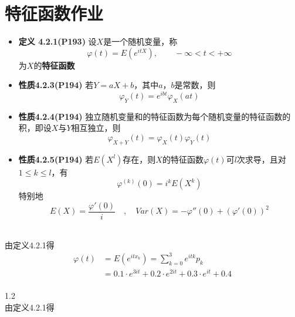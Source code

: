 \documentclass[a4paper]{ctexart}    %
\begin{document}
	\section{特征函数作业}
	\noindent
	\begin{tcolorbox}
		[colframe=blue!25,
		colback=blue!10,
		coltitle=blue!20!black,  
		fonttitle=\bfseries,
		adjusted title=Formula Or Theorem:
		]
		\begin{itemize}
			\item \textbf{定义 4.2.1(P193)} 设$ X $是一个随机变量，称
			\begin{equation*}
				\varphi(t) = E(e^{itX}), \qquad -\infty < t < +\infty
			\end{equation*}
			为$ X $的\textbf{特征函数}
			\item \textbf{性质4.2.3(P194)} 若$ Y = aX + b $，其中$ a $，$ b $是常数，则
			\begin{equation*}
				\varphi_{Y}(t) = e^{ibt}\varphi_{X} (at)
			\end{equation*}
			\item \textbf{性质4.2.4(P194)} 独立随机变量和的特征函数为每个随机变量的特征函数的积，即设$ X $与$ Y $相互独立，则
			\begin{equation*}
				\varphi_{X+Y}(t) = \varphi_{X}(t)\varphi_{Y}(t)
			\end{equation*}
			\item \textbf{性质4.2.5(P194)} 若$ E(X^{l}) $存在，则$ X $的特征函数$ \varphi(t) $可$ l $次求导，且对$ 1 \leq k \leq l $，有
			\begin{equation*}
				\varphi^{(k)}(0) = i^kE(X^k)
			\end{equation*}
			特别地
			\begin{equation*}
				E(X) = \frac{\varphi'(0)}{i} \quad , \quad Var(X) = -\varphi''(0) + (\varphi'(0))^2
			\end{equation*}
		\end{itemize}
	\end{tcolorbox}
	 \\
	由定义4.2.1得
	\begin{equation*}
		\begin{split}
			\varphi (t) & = E(e^{itx_k}) = \sum\limits_{k=0}^{3} e^{itk}p_k\\
			& = 0.1\cdot e^{3it} + 0.2\cdot e^{2it} + 0.3\cdot e^{it} + 0.4
		\end{split}
	\end{equation*}
	\\
	1.2 \\
	由定义4.2.1得
\end{document}
